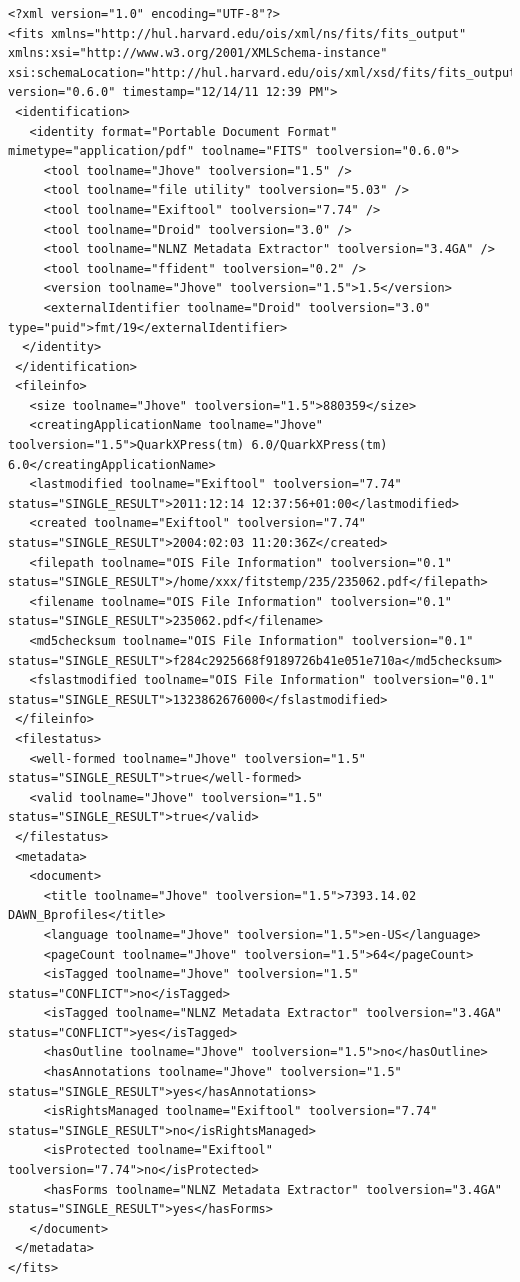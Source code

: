 \lstset{
language=XML,
basicstyle=\tiny\ttfamily,
label=lst:fits_example,
caption=An example FITS output file}
\begin{lstlisting}
<?xml version="1.0" encoding="UTF-8"?>
<fits xmlns="http://hul.harvard.edu/ois/xml/ns/fits/fits_output" xmlns:xsi="http://www.w3.org/2001/XMLSchema-instance" xsi:schemaLocation="http://hul.harvard.edu/ois/xml/xsd/fits/fits_output.xsd" version="0.6.0" timestamp="12/14/11 12:39 PM">
 <identification>
   <identity format="Portable Document Format" mimetype="application/pdf" toolname="FITS" toolversion="0.6.0">
     <tool toolname="Jhove" toolversion="1.5" />
     <tool toolname="file utility" toolversion="5.03" />
     <tool toolname="Exiftool" toolversion="7.74" />
     <tool toolname="Droid" toolversion="3.0" />
     <tool toolname="NLNZ Metadata Extractor" toolversion="3.4GA" />
     <tool toolname="ffident" toolversion="0.2" />
     <version toolname="Jhove" toolversion="1.5">1.5</version>
     <externalIdentifier toolname="Droid" toolversion="3.0" type="puid">fmt/19</externalIdentifier>
  </identity>
 </identification>
 <fileinfo>
   <size toolname="Jhove" toolversion="1.5">880359</size>
   <creatingApplicationName toolname="Jhove" toolversion="1.5">QuarkXPress(tm) 6.0/QuarkXPress(tm) 6.0</creatingApplicationName>
   <lastmodified toolname="Exiftool" toolversion="7.74" status="SINGLE_RESULT">2011:12:14 12:37:56+01:00</lastmodified>
   <created toolname="Exiftool" toolversion="7.74" status="SINGLE_RESULT">2004:02:03 11:20:36Z</created>
   <filepath toolname="OIS File Information" toolversion="0.1" status="SINGLE_RESULT">/home/xxx/fitstemp/235/235062.pdf</filepath>
   <filename toolname="OIS File Information" toolversion="0.1" status="SINGLE_RESULT">235062.pdf</filename>
   <md5checksum toolname="OIS File Information" toolversion="0.1" status="SINGLE_RESULT">f284c2925668f9189726b41e051e710a</md5checksum>
   <fslastmodified toolname="OIS File Information" toolversion="0.1" status="SINGLE_RESULT">1323862676000</fslastmodified>
 </fileinfo>
 <filestatus>
   <well-formed toolname="Jhove" toolversion="1.5" status="SINGLE_RESULT">true</well-formed>
   <valid toolname="Jhove" toolversion="1.5" status="SINGLE_RESULT">true</valid>
 </filestatus>
 <metadata>
   <document>
     <title toolname="Jhove" toolversion="1.5">7393.14.02 DAWN_Bprofiles</title>
     <language toolname="Jhove" toolversion="1.5">en-US</language>
     <pageCount toolname="Jhove" toolversion="1.5">64</pageCount>
     <isTagged toolname="Jhove" toolversion="1.5" status="CONFLICT">no</isTagged>
     <isTagged toolname="NLNZ Metadata Extractor" toolversion="3.4GA" status="CONFLICT">yes</isTagged>
     <hasOutline toolname="Jhove" toolversion="1.5">no</hasOutline>
     <hasAnnotations toolname="Jhove" toolversion="1.5" status="SINGLE_RESULT">yes</hasAnnotations>
     <isRightsManaged toolname="Exiftool" toolversion="7.74" status="SINGLE_RESULT">no</isRightsManaged>
     <isProtected toolname="Exiftool" toolversion="7.74">no</isProtected>
     <hasForms toolname="NLNZ Metadata Extractor" toolversion="3.4GA" status="SINGLE_RESULT">yes</hasForms>
   </document>
 </metadata>
</fits>
\end{lstlisting}
\pagebreak

